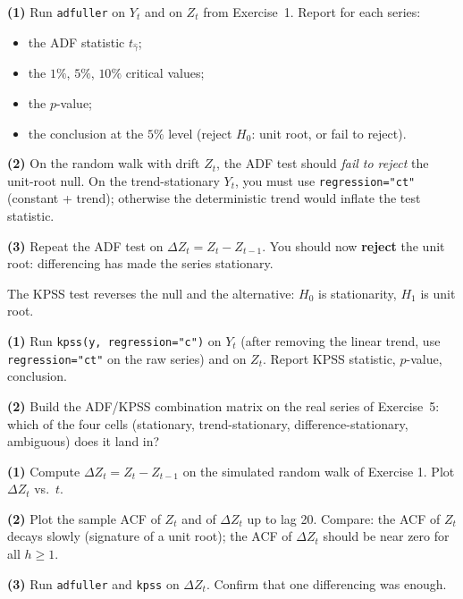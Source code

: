 \documentclass[a4paper,11pt]{article}
\begin{document}
\begin{exercise}
\textbf{(1)} Run \texttt{adfuller} on $Y_t$ and on $Z_t$ from
Exercise~1. Report for each series:
\begin{itemize}
  \item the ADF statistic $t_{\widehat\gamma}$;
  \item the $1\%$, $5\%$, $10\%$ critical values;
  \item the $p$-value;
  \item the conclusion at the $5\%$ level (reject $H_0$: unit root,
        or fail to reject).
\end{itemize}

\textbf{(2)} On the random walk with drift $Z_t$, the ADF test should
\emph{fail to reject} the unit-root null. On the trend-stationary
$Y_t$, you must use \texttt{regression="ct"} (constant + trend);
otherwise the deterministic trend would inflate the test statistic.

\textbf{(3)} Repeat the ADF test on $\Delta Z_t = Z_t - Z_{t-1}$.
You should now \textbf{reject} the unit root: differencing has made
the series stationary.
\end{exercise}

\begin{exercise}
The KPSS test reverses the null and the alternative:
$H_0$ is stationarity, $H_1$ is unit root.

\textbf{(1)} Run \texttt{kpss(y, regression="c")} on $Y_t$ (after
removing the linear trend, use \texttt{regression="ct"} on the raw
series) and on $Z_t$. Report KPSS statistic, $p$-value, conclusion.

\textbf{(2)} Build the ADF/KPSS combination matrix on the real
series of Exercise~5: which of the four cells (stationary,
trend-stationary, difference-stationary, ambiguous) does it land in?
\end{exercise}

\begin{exercise}
\textbf{(1)} Compute $\Delta Z_t = Z_t - Z_{t-1}$ on the simulated
random walk of Exercise 1. Plot $\Delta Z_t$ vs.\ $t$.

\textbf{(2)} Plot the sample ACF of $Z_t$ and of $\Delta Z_t$ up
to lag 20. Compare: the ACF of $Z_t$ decays slowly (signature of
a unit root); the ACF of $\Delta Z_t$ should be near zero for
all $h \geq 1$.

\textbf{(3)} Run \texttt{adfuller} and \texttt{kpss} on $\Delta Z_t$.
Confirm that one differencing was enough.
\end{exercise}
\end{document}
